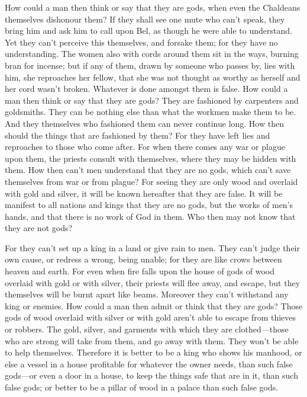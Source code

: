  How could a man then think or say that they are gods, when
even the Chaldeans themselves dishonour them?  If they
shall see one mute who can't speak, they bring him and ask him to call
upon Bel, as though he were able to understand.  Yet they
can't perceive this themselves, and forsake them; for they have no
understanding.  The women also with cords around them sit
in the ways, burning bran for incense; but if any of them, drawn by
someone who passes by, lies with him, she reproaches her fellow, that
she was not thought as worthy as herself and her cord wasn't broken.
 Whatever is done amongst them is false. How could a man
then think or say that they are gods?  They are fashioned
by carpenters and goldsmiths. They can be nothing else than what the
workmen make them to be.  And they themselves who fashioned
them can never continue long. How then should the things that are
fashioned by them?  For they have left lies and reproaches
to those who come after.  For when there comes any war or
plague upon them, the priests consult with themselves, where they may be
hidden with them.  How then can't men understand that they
are no gods, which can't save themselves from war or from plague?
 For seeing they are only wood and overlaid with gold and
silver, it will be known hereafter that they are false.  It
will be manifest to all nations and kings that they are no gods, but the
works of men's hands, and that there is no work of God in them.
 Who then may not know that they are not gods?

 For they can't set up a king in a land or give rain to
men.  They can't judge their own cause, or redress a wrong,
being unable; for they are like crows between heaven and earth.
 For even when fire falls upon the house of gods of wood
overlaid with gold or with silver, their priests will flee away, and
escape, but they themselves will be burnt apart like beams.
 Moreover they can't withstand any king or enemies. How
could a man then admit or think that they are gods?  Those
gods of wood overlaid with silver or with gold aren't able to escape
from thieves or robbers.  The gold, silver, and garments
with which they are clothed---those who are strong will take from them,
and go away with them. They won't be able to help themselves.
 Therefore it is better to be a king who shows his manhood,
or else a vessel in a house profitable for whatever the owner needs,
than such false gods---or even a door in a house, to keep the things
safe that are in it, than such false gods; or better to be a pillar of
wood in a palace than such false gods.

